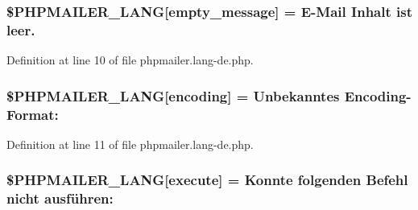 \subsubsection[{\texorpdfstring{\$\+P\+H\+P\+M\+A\+I\+L\+E\+R\+\_\+\+L\+A\+NG}{$PHPMAILER_LANG}}]{\setlength{\rightskip}{0pt plus 5cm}\$P\+H\+P\+M\+A\+I\+L\+E\+R\+\_\+\+L\+A\+NG\mbox{[}\textquotesingle{}empty\+\_\+message\textquotesingle{}\mbox{]} = \textquotesingle{}E-\/Mail Inhalt ist leer.\textquotesingle{}}\hypertarget{phpmailer_8lang-de_8php_a33772099f637c9d6c2cd7425e0e37fed}{}\label{phpmailer_8lang-de_8php_a33772099f637c9d6c2cd7425e0e37fed}


Definition at line 10 of file phpmailer.\+lang-\/de.\+php.

\subsubsection[{\texorpdfstring{\$\+P\+H\+P\+M\+A\+I\+L\+E\+R\+\_\+\+L\+A\+NG}{$PHPMAILER_LANG}}]{\setlength{\rightskip}{0pt plus 5cm}\$P\+H\+P\+M\+A\+I\+L\+E\+R\+\_\+\+L\+A\+NG\mbox{[}\textquotesingle{}encoding\textquotesingle{}\mbox{]} = \textquotesingle{}Unbekanntes Encoding-\/Format\+: \textquotesingle{}}\hypertarget{phpmailer_8lang-de_8php_a817f7283f3d54c970a0c10305cc668cc}{}\label{phpmailer_8lang-de_8php_a817f7283f3d54c970a0c10305cc668cc}


Definition at line 11 of file phpmailer.\+lang-\/de.\+php.

\subsubsection[{\texorpdfstring{\$\+P\+H\+P\+M\+A\+I\+L\+E\+R\+\_\+\+L\+A\+NG}{$PHPMAILER_LANG}}]{\setlength{\rightskip}{0pt plus 5cm}\$P\+H\+P\+M\+A\+I\+L\+E\+R\+\_\+\+L\+A\+NG\mbox{[}\textquotesingle{}execute\textquotesingle{}\mbox{]} = \textquotesingle{}Konnte folgenden Befehl nicht ausführen\+: \textquotesingle{}}\hypertarget{phpmailer_8lang-de_8php_a668217a9563a168f30f2a8548b6ed5a9}{}\label{phpmailer_8lang-de_8php_a668217a9563a168f30f2a8548b6ed5a9}


